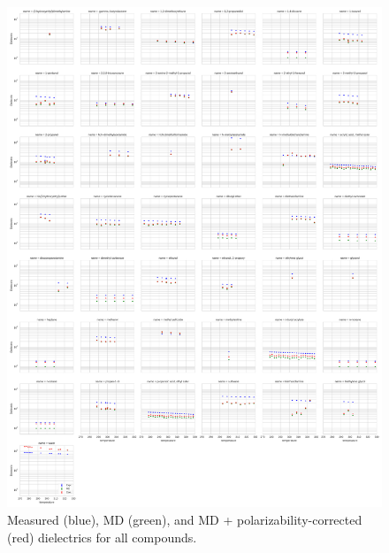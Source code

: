\documentclass[journal=jacsat,manuscript=article]{achemso}
\begin{document}
\begin{figure}

\includegraphics[width=\columnwidth]{./figures/dielectric_versus_temperature_all.pdf}

\caption{Measured (blue), MD (green), and MD + polarizability-corrected (red) dielectrics for all compounds.
}
\label{figure:AllDielectrics}

\end{figure}
\end{document}
